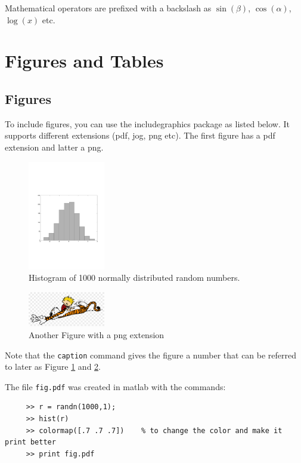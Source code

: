 Mathematical operators are prefixed with a backslash as $\sin(\beta)$, $\cos(\alpha)$, $\log(x)$ etc.


\section{Figures and Tables}
\subsection{Figures}
To include figures, you can use the includegraphics package as listed below. It supports different extensions (pdf, jog, png etc). 
The first figure has a pdf extension and latter a png.
\begin{figure}[H]
	\centering
	\includegraphics[width=0.3\textwidth]{fig}
	\caption{Histogram of 1000 normally distributed random
numbers.}
	\label{figlabel}
\end{figure}

\begin{figure}[H]
	\centering
	\includegraphics[width=0.3\textwidth]{calvin}
	\caption{Another Figure with a png extension}
	\label{calvin}
\end{figure}



Note that the {\tt caption} command gives the figure a number that can be referred to later as Figure \ref{figlabel} and \ref{calvin}.

The file {\tt fig.pdf} was created in matlab with the commands:
\begin{verbatim}
     >> r = randn(1000,1);
     >> hist(r)             
     >> colormap([.7 .7 .7])    % to change the color and make it print better
     >> print fig.pdf
\end{verbatim}



